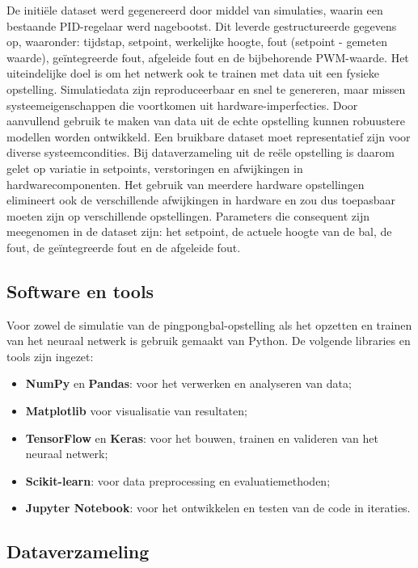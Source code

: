 De initiële dataset werd gegenereerd door middel van simulaties, waarin een bestaande PID-regelaar werd nagebootst. Dit leverde gestructureerde gegevens op, waaronder: tijdstap, setpoint, werkelijke hoogte, fout (setpoint - gemeten waarde), geïntegreerde fout, afgeleide fout en de bijbehorende PWM-waarde.
Het uiteindelijke doel is om het netwerk ook te trainen met data uit een fysieke opstelling. Simulatiedata zijn reproduceerbaar en snel te genereren, maar missen systeemeigenschappen die voortkomen uit hardware-imperfecties. Door aanvullend gebruik te maken van data uit de echte opstelling kunnen robuustere modellen worden ontwikkeld.
Een bruikbare dataset moet representatief zijn voor diverse systeemcondities. Bij dataverzameling uit de reële opstelling is daarom gelet op variatie in setpoints, verstoringen en afwijkingen in hardwarecomponenten. Het gebruik van meerdere hardware opstellingen elimineert ook de verschillende afwijkingen in hardware en zou dus toepasbaar moeten zijn op verschillende opstellingen. Parameters die consequent zijn meegenomen in de dataset zijn: het setpoint, de actuele hoogte van de bal, de fout, de geïntegreerde fout en de afgeleide fout.



\subsection{Software en tools}

Voor zowel de simulatie van de pingpongbal-opstelling als het opzetten en trainen van het neuraal netwerk is gebruik gemaakt van Python. De volgende libraries en tools zijn ingezet:
\begin{itemize}
    \item \textbf{NumPy} en \textbf{Pandas}: voor het verwerken en analyseren van data;
    \item \textbf{Matplotlib} voor visualisatie van resultaten;
    \item \textbf{TensorFlow}\cite{TensorFlowTutorials2024} en \textbf{Keras}: voor het bouwen, trainen en valideren van het neuraal netwerk;
    \item \textbf{Scikit-learn}: voor data preprocessing en evaluatiemethoden;
    \item \textbf{Jupyter Notebook}: voor het ontwikkelen en testen van de code in iteraties.
\end{itemize}

\subsection{Dataverzameling}

